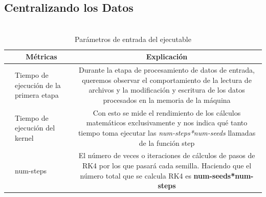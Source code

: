 \subsection{Centralizando los Datos} \label{sec:Centering}


\begin{table}[H]
	\centering
	\vspace{-4mm}
	\caption{\\Parámetros de entrada del ejecutable} \label{tab:parametros}
	\begin{tabular}{lm{4.7cm}m{0.60\linewidth}c}
		\hline
		\multicolumn{1}{l}{}                  &
		\multicolumn{1}{c}{\textbf{Métricas}} &
		\multicolumn{1}{c}{\textbf{Explicación}}                                                                                                                                                               \\ \hline
		                                      & \centering Tiempo de ejecución de la primera etapa &
		Durante la etapa de procesamiento de datos de entrada, queremos observar el comportamiento de la lectura de archivos y la modificación y escritura de los datos procesados en la memoria de la máquina \\

		                                      & \centering Tiempo de ejecución del kernel          &
		Con esto se mide el rendimiento de los cálculos matemáticos exclusivamente y nos indica qué tanto tiempo toma ejecutar las \textit{num-steps*num-seeds} llamadas de la función step                    \\

		                                      & \centering  num-steps                              &
		El número de veces o iteraciones de cálculos de pasos de RK4 por los que pasará cada semilla. Haciendo que el número total que se calcula RK4 es \textbf{num-seeds*num-steps}                          \\


\end{tabular}
\end{table}
